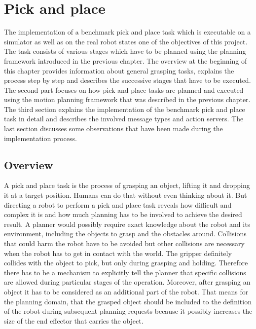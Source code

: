 
\chapter{Pick and place}
\label{chap:pick_place}

The implementation of a benchmark pick and place task which is executable on a simulator as well as on the real robot states one of the objectives of this project. The task consists of various stages which have to be planned using the planning framework introduced in the previous chapter. The overview at the beginning of this chapter provides information about general grasping tasks, explains the process step by step and describes the successive stages that have to be executed. The second part focuses on how pick and place tasks are planned and executed using the motion planning framework that was described in the previous chapter. The third section explains the implementation of the benchmark pick and place task in detail and describes the involved message types and action servers. The last section discusses some observations that have been made during the implementation process.

\section{Overview}

A pick and place task is the process of grasping an object, lifting it and dropping it at a target position. Humans can do that without even thinking about it. But directing a robot to perform a pick and place task reveals how difficult and complex it is and how much planning has to be involved to achieve the desired result. A planner would possibly require exact knowledge about the robot and its environment, including the objects to grasp and the obstacles around. Collisions that could harm the robot have to be avoided but other collisions are necessary when the robot has to get in contact with the world. The gripper definitely collides with the object to pick, but only during grasping and holding. Therefore there has to be a mechanism to explicitly tell the planner that specific collisions are allowed during particular stages of the operation. Moreover, after grasping an object it has to be considered as an additional part of the robot. That means for the planning domain, that the grasped object should be included to the definition of the robot during subsequent planning requests because it possibly increases the size of the end effector that carries the object. \\


